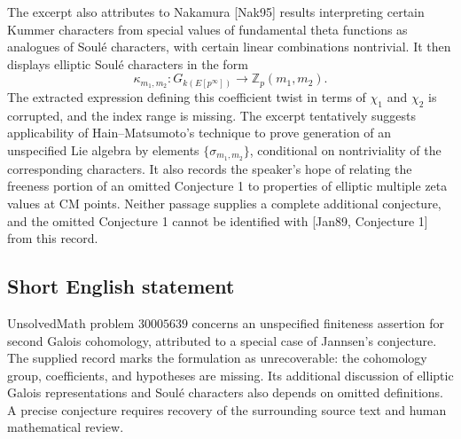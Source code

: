 \documentclass[11pt]{article}
\newcommand{\Z}{\mathbb{Z}}
\begin{document}
The excerpt also attributes to Nakamura [Nak95] results interpreting certain Kummer characters from special values of fundamental theta functions as analogues of Soul\'e characters, with certain linear combinations nontrivial. It then displays elliptic Soul\'e characters in the form
\[
\kappa_{m_1,m_2}\colon G_{k(E[p^\infty])}\longrightarrow\Z_p(m_1,m_2).
\]
The extracted expression defining this coefficient twist in terms of \(\chi_1\) and \(\chi_2\) is corrupted, and the index range is missing. The excerpt tentatively suggests applicability of Hain--Matsumoto's technique to prove generation of an unspecified Lie algebra by elements \(\{\sigma_{m_1,m_2}\}\), conditional on nontriviality of the corresponding characters. It also records the speaker's hope of relating the freeness portion of an omitted Conjecture 1 to properties of elliptic multiple zeta values at CM points. Neither passage supplies a complete additional conjecture, and the omitted Conjecture 1 cannot be identified with [Jan89, Conjecture 1] from this record.
\subsection{Short English statement}
UnsolvedMath problem \(30005639\) concerns an unspecified finiteness assertion for second Galois cohomology, attributed to a special case of Jannsen's conjecture. The supplied record marks the formulation as unrecoverable: the cohomology group, coefficients, and hypotheses are missing. Its additional discussion of elliptic Galois representations and Soul\'e characters also depends on omitted definitions. A precise conjecture requires recovery of the surrounding source text and human mathematical review.
\end{document}
